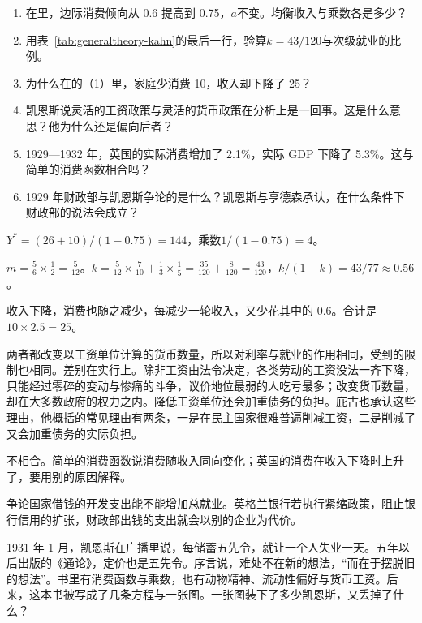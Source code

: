 \begin{selfcheck}
\begin{enumerate}
\item 在里，边际消费倾向从 0.6 提高到 0.75，$a$不变。均衡收入与乘数各是多少？
\item 用表~\ref{tab:generaltheory-kahn}的最后一行，验算$k=43/120$与次级就业的比例。
\item 为什么在的（1）里，家庭少消费 10，收入却下降了 25？
\item 凯恩斯说灵活的工资政策与灵活的货币政策在分析上是一回事。这是什么意思？他为什么还是偏向后者？
\item 1929—1932 年，英国的实际消费增加了 2.1\%，实际 GDP 下降了 5.3\%。这与简单的消费函数相合吗？
\item 1929 年财政部与凯恩斯争论的是什么？凯恩斯与亨德森承认，在什么条件下财政部的说法会成立？
\end{enumerate}
\end{selfcheck}

\begin{answers}
\item $Y^{*}=(26+10)/(1-0.75)=144$，乘数$1/(1-0.75)=4$。
\item $m=\frac{5}{6}\times\frac{1}{2}=\frac{5}{12}$。$k=\frac{5}{12}\times\frac{7}{10}+\frac{1}{3}\times\frac{1}{5}=\frac{35}{120}+\frac{8}{120}=\frac{43}{120}$，$k/(1-k)=43/77\approx0.56$。
\item 收入下降，消费也随之减少，每减少一轮收入，又少花其中的 0.6。合计是$10\times2.5=25$。
\item 两者都改变以工资单位计算的货币数量，所以对利率与就业的作用相同，受到的限制也相同。差别在实行上。除非工资由法令决定，各类劳动的工资没法一齐下降，只能经过零碎的变动与惨痛的斗争，议价地位最弱的人吃亏最多；改变货币数量，却在大多数政府的权力之内。降低工资单位还会加重债务的负担。庇古也承认这些理由，他概括的常见理由有两条，一是在民主国家很难普遍削减工资，二是削减了又会加重债务的实际负担。
\item 不相合。简单的消费函数说消费随收入同向变化；英国的消费在收入下降时上升了，要用别的原因解释。
\item 争论国家借钱的开发支出能不能增加总就业。英格兰银行若执行紧缩政策，阻止银行信用的扩张，财政部出钱的支出就会以别的企业为代价。
\end{answers}

1931 年 1 月，凯恩斯在广播里说，每储蓄五先令，就让一个人失业一天。五年以后出版的《通论》，定价也是五先令\cite{keynes1936}。序言说，难处不在新的想法，“而在于摆脱旧的想法”\cite{keynes1936}。书里有消费函数与乘数，也有动物精神、流动性偏好与货币工资。后来，这本书被写成了几条方程与一张图。一张图装下了多少凯恩斯，又丢掉了什么？
